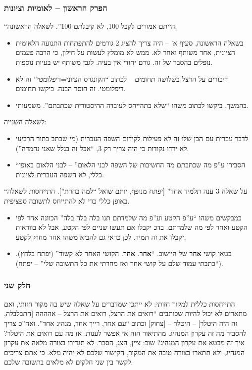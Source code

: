 \documentclass[]{article}
\theoremstyle{definition}
\begin{document}
    \subsubsection*{הפרק הראשון – לאומיות וציונות}
    ``הייתם אמורים לקבל 100, לא קיבלתם 100''. לשאלה הראשונה: 
    \begin{itemize}
        \item בשאלה הראשונה, סעיף א' – היה צריך להציג 2 גורמים להתפתחות התנועה הלאומית הציונית, אחד משותף ואחר לא. ממש לא מומלץ לעשות על חילון, כי הרבה פעמים נופלים בהסבר של זה. גורם יחודי אין בעיה. לגבי משותף יש בעיות נוספות. 
        \item דיבורים על הרצל בשלושה תחומים – לכתוב ``הקונגרס הציוני=דיפלומטי'' זה לא דיפלומטי. זה חוסר הבנה. ביקשו תחומים. 
        \item בהמשך, ביקשו לכתוב משהו ``שלא בתהייחס לעובדה ההיסטורית שכתבתם''. משמעותי. 
    \end{itemize}
    לשאלה השנייה: 
    \begin{itemize}
        \item לדבר עברית עם הבן שלו זה לא פעילות לקידום השפה העברית (מי שכתב בתור הרביעי לא ירדו נקודות כי היה צריך רק 3, ``אבל זה בגלל שאני נחמדה''). 
        \item ``הסבירו ע''פ מה שכתבתם מה החשיבות של השפה לבני הלאום'' – לבני הלאום באופן כללי, לא השפה העברית לציונות. 
    \end{itemize}
    ``על שאלה 3 ענה תלמיד אחד'' [יפתח מנופף, יותם שואל ``למה בחרת'']. התייחסות לשאלה באופן כללי כדי לא להתייחס לתשובה ספציפית. 
    \begin{itemize}
        \item כמבקשים משהו ``ע''פ הקטע וע''פ מה שלמדתם תנו בלה בלה בלה'' הכוונה אחד לפי הקטע ואחד לפי מה שלמדתם. בדכ יקבלו אם תעשו שניים לפי הקטע, אבל לא בוודאות יקבלו את זה תמיד. לכן כדאי גם להביא משהו אחד מחוץ לקטע. 
        \item בטאו קושי \textbf{אחר} של היישוב. ``\textbf{אחר}. \textbf{אחר}. הקושי האחר לא קשור'' (יפתח בלחץ). (``כתבתי עמוד שלם על קושי אחר ואז מחרתי את כל התשובה שלי'' – יפתח). 
    \end{itemize}
    
    \subsubsection*{חלק שני}
    התייחסות כללית למקור חזותי: לא ייתכן שמדברים על שאלה שיש בה מקור חזותי, ואם מתארים לא יכול להיות שכותבים ``רואים את הרצל, רואים את הרצל – אהההה [התבלבלה, זה היה היטלר] – היטלר – [צחוק] וכתוב ``עם אחד, רייך אחד, מנהיג אחד''. ואח''כ צריך להסביר מה זה עקרון המנהיג. מהתיאור הזה אי אפשר לענות. אז מה עם רואים את היטלר? איך זה מבטא את עקרון המנהיג? שוב: ציין, הצג, הסבר. לא תגדירו בצורה מלאה את עקרון המנהיג, ולא תתארו בצורה טובה את המקור, הקישור שלכם לא יהיה מלא. כי אתם צריכים לקשר בין שני חלקים לא מלאים בתשובה שלכם. 
    
\end{document}
